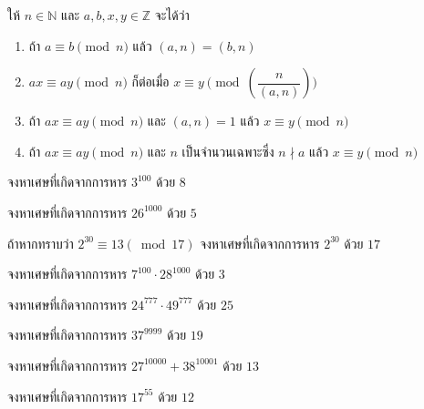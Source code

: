 \begin{theorembox}
	ให้ $n \in \mathbb{N}$ และ $a, b, x, y \in \mathbb{Z}$ จะได้ว่า
	\begin{enumerate}
		\item ถ้า $a \equiv b \pmod{n}$ แล้ว $(a, n) = (b, n)$
		\item $ax \equiv ay \pmod{n}$ ก็ต่อเมื่อ $x \equiv y \pmod{\left( \dfrac{n}{(a, n)} \right)}$
		\item ถ้า $ax \equiv ay \pmod{n}$ และ $(a, n) = 1$ แล้ว $x \equiv y \pmod{n}$
		\item ถ้า $ax \equiv ay \pmod{n}$ และ $n$ เป็นจำนวนเฉพาะซึ่ง $n \nmid a$ แล้ว $x \equiv y \pmod{n}$
	\end{enumerate}
\end{theorembox}

\begin{examplebox}
	จงหาเศษที่เกิดจากการหาร $3^{100}$ ด้วย $8$   
\end{examplebox}
\solution
\vspace{5cm} 

\newpage
\begin{examplebox}
	จงหาเศษที่เกิดจากการหาร $26^{1000}$ ด้วย $5$ 
\end{examplebox}
\solution 

\newpage
\begin{examplebox}
	ถ้าหากทราบว่า $2^{30} \equiv 13(\bmod 17)$ จงหาเศษที่เกิดจากการหาร $2^{30}$ ด้วย $17$     
\end{examplebox}
\solution
\newpage


\begin{examplebox}
	จงหาเศษที่เกิดจากการหาร $7^{100}\cdot 28^{1000}$ ด้วย $3$   
\end{examplebox}
\solution
\newpage

\begin{examplebox}
	จงหาเศษที่เกิดจากการหาร $24^{777}\cdot 49^{777}$ ด้วย $25$ 
\end{examplebox}
\solution 
\newpage

\begin{examplebox}
	จงหาเศษที่เกิดจากการหาร $37^{9999}$ ด้วย $19$     
\end{examplebox}
\solution
\newpage


\begin{examplebox}
	จงหาเศษที่เกิดจากการหาร $27^{10000}+38^{10001}$ ด้วย $13$ 
\end{examplebox}
\solution 
\newpage

\begin{examplebox}
	จงหาเศษที่เกิดจากการหาร $17^{55}$ ด้วย $12$     
\end{examplebox}
\solution
\newpage


